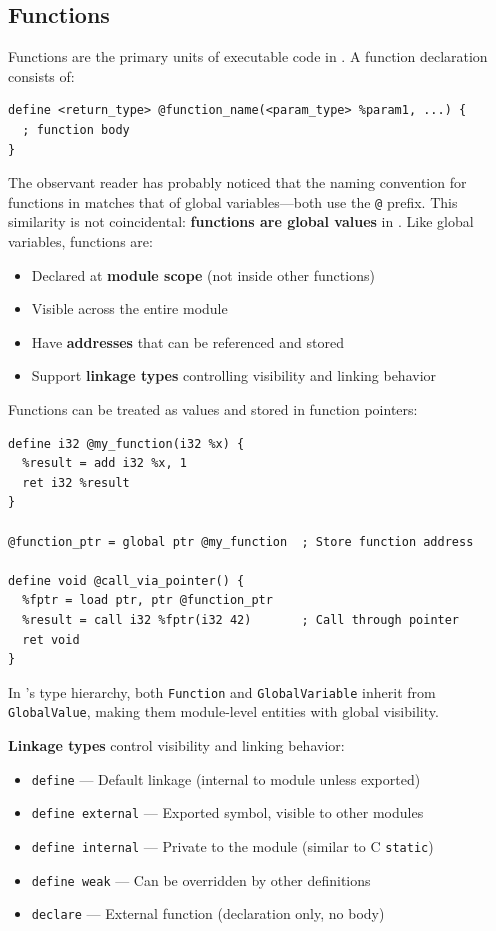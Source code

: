\subsection{Functions}

Functions are the primary units of executable code in  . A function declaration consists of:

\begin{lstlisting}[style=ir]
define <return_type> @function_name(<param_type> %param1, ...) {
  ; function body
}
\end{lstlisting}

The observant reader has probably noticed that the naming convention for functions in  matches that of global variables---both use the \texttt{@} prefix.
This similarity is not coincidental: \textbf{functions are global values} in  .
Like global variables, functions are:

\begin{itemize}[noitemsep]
  \item Declared at \textbf{module scope} (not inside other functions)
  \item Visible across the entire module
  \item Have \textbf{addresses} that can be referenced and stored
  \item Support \textbf{linkage types} controlling visibility and linking behavior
\end{itemize}

Functions can be treated as values and stored in function pointers:

\begin{lstlisting}[style=ir]
define i32 @my_function(i32 %x) {
  %result = add i32 %x, 1
  ret i32 %result
}

@function_ptr = global ptr @my_function  ; Store function address

define void @call_via_pointer() {
  %fptr = load ptr, ptr @function_ptr
  %result = call i32 %fptr(i32 42)       ; Call through pointer
  ret void
}
\end{lstlisting}

In 's type hierarchy, both \texttt{Function} and \texttt{GlobalVariable} inherit from \texttt{GlobalValue}, making them module-level entities with global visibility.

\textbf{Linkage types} control visibility and linking behavior:

\begin{itemize}[noitemsep]
  \item \texttt{define} --- Default linkage (internal to module unless exported)
  \item \texttt{define external} --- Exported symbol, visible to other modules
  \item \texttt{define internal} --- Private to the module (similar to C \texttt{static})
  \item \texttt{define weak} --- Can be overridden by other definitions
  \item \texttt{declare} --- External function (declaration only, no body)
\end{itemize}

